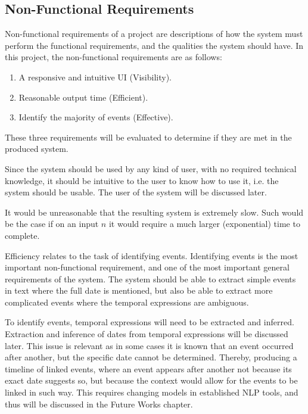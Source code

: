 \subsection{Non-Functional Requirements}
\par Non-functional requirements of a project are descriptions of how the system must perform the functional requirements, and the qualities the system should have. In this project, the non-functional requirements are as follows:
\begin{enumerate}
\item A responsive and intuitive UI (Visibility).
\item Reasonable output time (Efficient).
\item Identify the majority of events (Effective).
\end{enumerate}
These three requirements will be evaluated to determine if they are met in the produced system. 
\par Since the system should be used by any kind of user, with no required technical knowledge, it should be intuitive to the user to know how to use it, i.e. the system should be usable. The user of the system will be discussed later. 
\par It would be unreasonable that the resulting system is extremely slow. Such would be the case if on an input $n$ it would require a much larger (exponential) time to complete. 
\par Efficiency relates to the task of identifying events. Identifying events is the most important non-functional requirement, and one of the most important general requirements of the system. The system should be able to extract simple events in text where the full date is mentioned, but also be able to extract more complicated events where the temporal expressions are ambiguous. 
\par To identify events, temporal expressions will need to be extracted and inferred. Extraction and inference of dates from temporal expressions will be discussed later. This issue is relevant as in some cases it is known that an event occurred after another, but the specific date cannot be determined. Thereby, producing a timeline of linked events, where an event appears after another not because its exact date suggests so, but because the context would allow for the events to be linked in such way. This requires changing models in established NLP tools, and thus will be discussed in the Future Works chapter.

